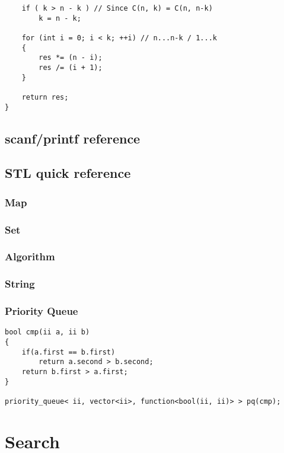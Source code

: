 \documentclass[10pt,oneside]{article}
\begin{document}
\begin{landscape}
\begin{multicols}{2}
\begin{lstlisting}
    if ( k > n - k ) // Since C(n, k) = C(n, n-k)
        k = n - k;
 
    for (int i = 0; i < k; ++i) // n...n-k / 1...k
    {
        res *= (n - i);
        res /= (i + 1);
    }
 
    return res;
}
\end{lstlisting}

\subsection{scanf/printf reference}


\subsection{STL quick reference}

\subsubsection{Map}


\subsubsection{Set}


\subsubsection{Algorithm}


\subsubsection{String}

\subsubsection{Priority Queue}

\begin{lstlisting}
bool cmp(ii a, ii b)
{
    if(a.first == b.first)
		return a.second > b.second;
    return b.first > a.first;
}

priority_queue< ii, vector<ii>, function<bool(ii, ii)> > pq(cmp);
\end{lstlisting}


\section{Search}


\end{multicols}
\end{landscape}
\end{document}
